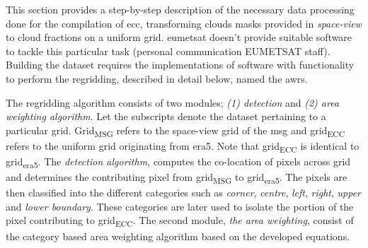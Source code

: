 This section provides a step-by-step description of the necessary data processing done for the compilation of \acrshort{ecc}, transforming clouds masks provided in \textit{space-view} to cloud fractions on a uniform grid. \acrshort{eumetsat} doesn't provide suitable software to tackle this particular task (personal communication EUMETSAT staff). Building the dataset requires the implementations of software with functionality to perform the regridding, described in detail below, named the \acrfull{awrs}.

The regridding algorithm consists of two modules; \textit{(1) detection} and \textit{(2) area weighting algorithm}. Let the subscripts denote the dataset pertaining to a particular grid. Grid\textsubscript{MSG} refers to the space-view grid of the \acrlong{msg} and grid\textsubscript{ECC} refers to the uniform grid originating from \acrshort{era5}. Note that grid\textsubscript{ECC} is identical to  grid\textsubscript{\acrshort{era5}}. The \textit{detection algorithm}, computes the co-location of pixels across grid and determines the contributing pixel from grid\textsubscript{MSG} to grid\textsubscript{\acrshort{era5}}.
%
The pixels are then classified into the different categories such as \textit{corner}, \textit{centre}, \textit{left}, \textit{right}, \textit{upper} and \textit{lower boundary}. These categories are later used to isolate the portion of the pixel contributing to grid\textsubscript{ECC}.
The second module, \textit{the area weighting}, consist of the category based area weighting algorithm based on the developed equations.


